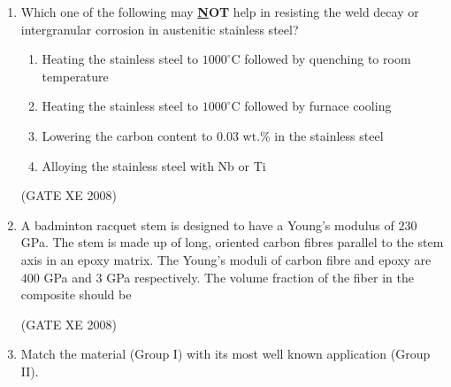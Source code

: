 \documentclass[12pt]{article}
\begin{document}
\begin{enumerate}
\begin{enumerate}
\item  $\gamma$ is an intermetallic compound  
\item  Equilibrium at $700^\circ$C is peritectic  
\item  Equilibrium at $420^\circ$C is eutectic  
\item  Equilibrium at $420^\circ$C is eutectoid  
\end{enumerate}

(GATE XE 2008)

\item Which one of the following may \textbf{\underline NOT} help in resisting the weld decay or intergranular corrosion in austenitic stainless steel?  

\begin{enumerate}

\item  Heating the stainless steel to $1000^\circ$C followed by quenching to room temperature  
\item  Heating the stainless steel to $1000^\circ$C followed by furnace cooling 
\item  Lowering the carbon content to $0.03$ wt.\% in the stainless steel  
\item  Alloying the stainless steel with Nb or Ti  
\end{enumerate}

(GATE XE 2008)

\item A badminton racquet stem is designed to have a Young’s modulus of $230$ GPa. The stem is made up of long, oriented carbon fibres parallel to the stem axis in an epoxy matrix. The Young’s moduli of carbon fibre and epoxy are $400$ GPa and $3$ GPa respectively. The volume fraction of the fiber in the composite should be  

\begin{enumerate}
\end{enumerate}

(GATE XE 2008)


\item Match the material (Group I) with its most well known application (Group II).


\end{enumerate}
\end{document}
